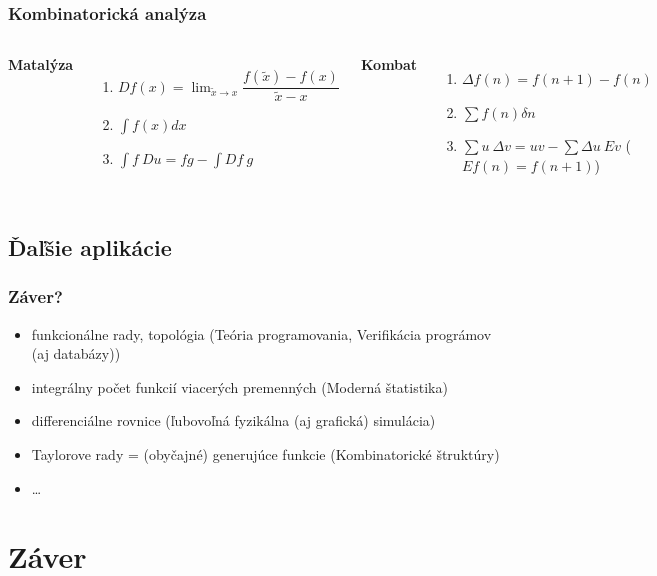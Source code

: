 \documentclass{beamer}
\begin{document}
\begin{frame}
\frametitle{Kombinatorická analýza}
\begin{columns}[c] %

\textbf{Matalýza}
\begin{enumerate}
\item<1-> $ D f(x) = \lim_{\tilde{x} \to x} \dfrac{f(\tilde{x}) - f(x)}{\tilde{x} - x}$
\item<2-> $\int f(x) dx$
\item<3-> $\int f~Du = fg - \int Df ~g $
\end{enumerate}

\textbf{Kombat}
\begin{enumerate}
\item<1-> $ \Delta f (n) = f(n+1) - f(n)$
\item<2-> $\sum f(n) \delta n$
\item<3-> $\sum u ~ \Delta v = u v - \sum \Delta u ~ Ev$ ($E f(n) = f(n+1)$)
\end{enumerate}
\end{columns}
\end{frame}

\subsection{Ďaľšie aplikácie}
\begin{frame}
\frametitle{Záver?}
\begin{itemize}
  \item funkcionálne rady, topológia (Teória programovania, Verifikácia prográmov (aj databázy))
  \item integrálny počet funkcií viacerých premenných (Moderná štatistika)
  \item differenciálne rovnice (ľubovoľná fyzikálna (aj grafická) simulácia)
  \item Taylorove rady = (obyčajné) generujúce funkcie (Kombinatorické štruktúry)
  \item \ldots
\end{itemize}
\end{frame}

\section{Záver}
\end{document}
